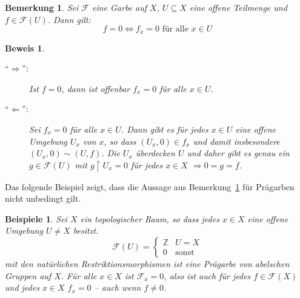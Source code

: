 \documentclass[a4paper,oneside]{scrbook}
\theoremstyle{break}
\newtheorem{Bem}[Def]{Bemerkung}
\newtheorem{Bsp}[Def]{Beispiele}
\theoremstyle{nonumberbreak}
\theoremstyle{nonumberplain}
\newtheorem{Bew}{Beweis}
\theoremstyle{break}
\newcommand{\ZZ}{%
	\ensuremath{\mathbb{Z}}%
}
\begin{document}
\begin{Bem}\label{bem:local=0_iff_global=0}
	Sei $\mathcal{F}$ eine Garbe auf $X$, $U \subseteq X$ eine offene Teilmenge und $f\in \mathcal{F}(U)$. Dann gilt:
	\[ f = 0 \Leftrightarrow f_x = 0 \text{ für alle } x \in U \]
\end{Bem}
\begin{Bew}
	\begin{description}
		\item["`$\Rightarrow$"':] Ist $f = 0$, dann ist offenbar $f_x = 0$ für alle $x \in U$.
		\item["`$\Leftarrow$"':] Sei $f_x = 0$ für alle $x \in U$. Dann gibt es für jedes $x\in U$ eine offene Umgebung $U_x$ von $x$, so dass $( U_x,0) \in f_x$ und damit insbesondere $(U_x,0 ) \sim (U,f)$. Die $U_x$ überdecken $U$ und daher gibt es genau ein $g \in \mathcal{F}(U)$ mit $g \restriction U_x = 0$ für jedes $x\in X$ $\Rightarrow 0 = g = f$.
	\end{description}
\end{Bew}



Das folgende Beispiel zeigt, dass die Aussage aus Bemerkung~\ref{bem:local=0_iff_global=0} für Prägarben nicht unbedingt gilt.
\begin{Bsp}
	Sei $X$ ein topologischer Raum, so dass jedes $x \in X$ eine offene Umgebung $U \neq X$ besitzt.
	\[ \mathcal{F}(U) = \begin{cases}%
	\ZZ	& U = X\\%
	0	& \text{sonst}%
	\end{cases}
	\]
	mit den natürlichen Restriktionsmorphismen ist eine Prägarbe von abelschen Gruppen auf $X$.
	Für alle $x\in X$ ist $\mathcal{F}_x = 0$, also ist auch für jedes $f \in \mathcal{F}(X)$ und jedes $x\in X$ $f_x = 0$ -- auch wenn $f \neq 0$.
\end{Bsp}
\end{document}
